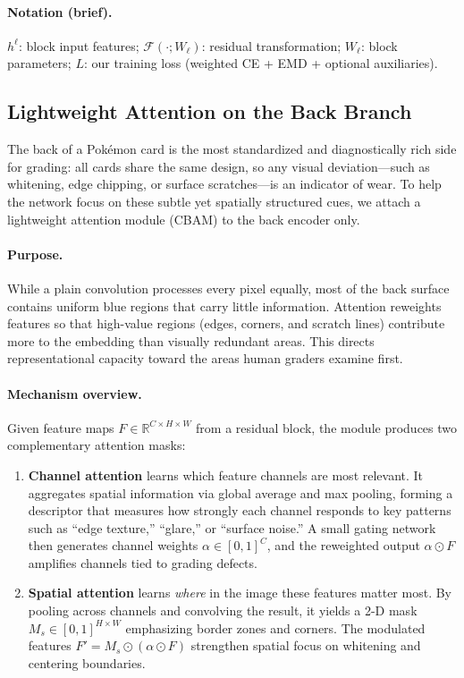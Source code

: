 \documentclass[12pt]{article}
\begin{document}
\paragraph{Notation (brief).}
$h^\ell$: block input features; $\mathcal{F}(\cdot;W_\ell)$: residual transformation; $W_\ell$: block parameters; $L$: our training loss (weighted CE + EMD + optional auxiliaries).


\subsection{Lightweight Attention on the Back Branch}
\label{subsec:attention-back}

The back of a Pokémon card is the most standardized and diagnostically rich side for grading: 
all cards share the same design, so any visual deviation—such as whitening, edge chipping, or surface scratches—is an indicator of wear. 
To help the network focus on these subtle yet spatially structured cues, we attach a lightweight attention module (CBAM) to the back encoder only.

\paragraph{Purpose.}
While a plain convolution processes every pixel equally, most of the back surface contains uniform blue regions that carry little information. 
Attention reweights features so that high-value regions (edges, corners, and scratch lines) contribute more to the embedding than visually redundant areas. 
This directs representational capacity toward the areas human graders examine first.

\paragraph{Mechanism overview.}
Given feature maps $F \in \mathbb{R}^{C \times H \times W}$ from a residual block, 
the module produces two complementary attention masks:
\begin{enumerate}
    \item \textbf{Channel attention} learns which feature channels are most relevant.  
    It aggregates spatial information via global average and max pooling, forming a descriptor that measures how strongly each channel responds to key patterns such as ``edge texture,'' ``glare,'' or ``surface noise.''  
    A small gating network then generates channel weights $\alpha \in [0,1]^C$, and the reweighted output $\alpha \odot F$ amplifies channels tied to grading defects.
    \item \textbf{Spatial attention} learns \emph{where} in the image these features matter most.  
    By pooling across channels and convolving the result, it yields a 2-D mask $M_s \in [0,1]^{H \times W}$ emphasizing border zones and corners.  
    The modulated features $F' = M_s \odot (\alpha \odot F)$ strengthen spatial focus on whitening and centering boundaries.
\end{enumerate}
\end{document}
